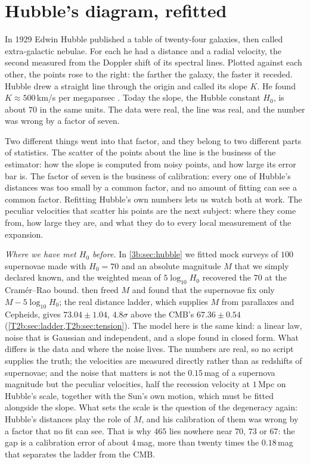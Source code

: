 \section{Hubble's diagram, refitted}
\label{11c:sec:hubble1929}

In 1929 Edwin Hubble published a table of twenty-four galaxies, then called
extra-galactic nebulae. For each he had a distance and a radial velocity, the
second measured from the Doppler shift of its spectral lines. Plotted against
each other, the points rose to the right: the farther the galaxy, the faster it
receded. Hubble drew a straight line through the origin and called its slope $K$.
He found $K\approx500$\,km/s per megaparsec \cite{Hubble1929}. Today the slope,
the Hubble constant $H_0$, is about $70$ in the same units. The data were real,
the line was real, and the number was wrong by a factor of seven.

Two different things went into that factor, and they belong to two different parts
of statistics. The scatter of the points about the line is the business of the
estimator: how the slope is computed from noisy points, and how large its error
bar is. The factor of seven is the business of calibration: every one of Hubble's
distances was too small by a common factor, and no amount of fitting can see a
common factor. Refitting Hubble's own numbers lets us watch both at work. The
peculiar velocities that scatter his points are the next subject: where they come
from, how large they are, and what they do to every local measurement of the
expansion.

\emph{Where we have met $H_0$ before.} In \cref{3b:sec:hubble} we fitted mock surveys
of $100$ supernovae made with $H_0=70$ and an absolute magnitude $M$ that we simply
declared known, and the weighted mean of $5\log_{10}H_0$ recovered the $70$ at the
Cram\'er--Rao bound.  then freed $M$ and found that the
supernovae fix only $M-5\log_{10}H_0$; the real distance ladder, which supplies $M$
from parallaxes and Cepheids, gives $73.04\pm1.04$, $4.8\sigma$ above the CMB's
$67.36\pm0.54$ (\cref{T2b:sec:ladder,T2b:sec:tension}). The model here is the same
kind: a linear law, noise that is Gaussian and independent, and a slope found in
closed form. What differs is the data and where the noise lives. The numbers are
real, so no script supplies the truth; the velocities are measured directly rather
than as redshifts of supernovae; and the noise that matters is not the $0.15$\,mag of
a supernova magnitude but the peculiar velocities, half the recession velocity at
$1$\,Mpc on Hubble's scale, together with the Sun's own motion, which must be fitted
alongside the slope. What sets the scale is the question of the degeneracy again:
Hubble's distances play the role of $M$, and his calibration of them was wrong by a
factor that no fit can see. That is why $465$ lies nowhere near $70$, $73$ or $67$:
the gap is a calibration error of about $4$\,mag, more than twenty times the
$0.18$\,mag that separates the ladder from the CMB.

